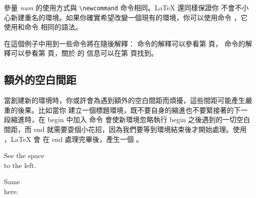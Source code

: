 參量 \emph{num} 的使用方式與 \verb|\newcommand| 命令相同。\LaTeX{} 還同樣保證你
不會不小心新建重名的環境。如果你確實希望改變一個現有的環境，你可以使用命令
 ，它使用和命令  相同的語法。

在這個例子中用到一些命令將在隨後解釋： 命令的解釋可以參看第 \pageref{sec:rule} 頁，
 命令的解釋可以參看第 \pageref{cmd:stretch} 頁，關於  的
信息可以在第 \pageref{sec:hspace} 頁找到。

\subsection{額外的空白間距}

當創建新的環境時，你或許會為遇到額外的空白間距而煩擾，這些間距可能產生嚴重的後果。比如當你
建立一個標題環境，既不要自身的縮進也不要緊接著的下一段縮進時，在 begin 中加入
命令  會使新環境忽略執行 begin 之後遇到的一切空白間距，而 end 
就需要耍個小花招，因為我們要等到環境結束後才開始處理。使用 ，\LaTeX{} 會
在 end 處理完畢後，產生一個 。

\begin{example}
\newenvironment{simple}%
 {\noindent}%
 {\par\noindent}

\begin{simple}
See the space\\to the left.
\end{simple}
Same\\here.
\end{example}

